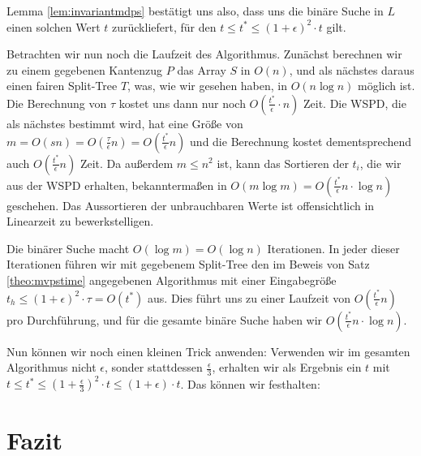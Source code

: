 \documentclass[11pt]{article}
\begin{document}
	Lemma \ref{lem:invariantmdps} bestätigt uns also, dass uns die binäre Suche in $L$ einen solchen Wert $t$ zurückliefert, für den $t \leq t^* \leq (1 + \epsilon)^2 \cdot t$ gilt.
	
	Betrachten wir nun noch die Laufzeit des Algorithmus.
	Zunächst berechnen wir zu einem gegebenen Kantenzug $P$ das Array $S$ in $O(n)$, und als nächstes daraus einen fairen Split-Tree $T$, was, wie wir gesehen haben, in $O(n \log n)$ möglich ist. 
	Die Berechnung von $\tau$ kostet uns dann nur noch $O(\frac{t^*}{\epsilon} \cdot n)$ Zeit. 
	Die WSPD, die als nächstes bestimmt wird, hat eine Größe von $m = O(sn) = O(\frac{\tau}{\epsilon}n) = O(\frac{t^*}{\epsilon}n)$ und die Berechnung kostet dementsprechend auch $O(\frac{t^*}{\epsilon}n)$ Zeit. 
	Da außerdem $m \leq n^2$ ist, kann das Sortieren der $t_i$, die wir aus der WSPD erhalten, bekanntermaßen in $O(m \log m) = O(\frac{t^*}{\epsilon}n \cdot \log n)$ geschehen. 
	Das Aussortieren der unbrauchbaren Werte ist offensichtlich in Linearzeit zu bewerkstelligen. 
	
	Die binärer Suche macht $O(\log m) = O(\log n)$ Iterationen. 
	In jeder dieser Iterationen führen wir mit gegebenem Split-Tree den im Beweis von Satz \ref{theo:mvpstime} angegebenen Algorithmus mit einer Eingabegröße $t_h \leq (1 + \epsilon)^2 \cdot \tau = O(t^*)$ aus. 
	Dies führt uns zu einer Laufzeit von $O(\frac{t^*}{\epsilon}n)$ pro Durchführung, und für die gesamte binäre Suche haben wir $O(\frac{t^*}{\epsilon}n \cdot \log n)$.
	
	Nun können wir noch einen kleinen Trick anwenden: Verwenden wir im gesamten Algorithmus nicht $\epsilon$, sonder stattdessen $\frac{\epsilon}{3}$, erhalten wir als Ergebnis ein $t$ mit $t \leq t^* \leq (1 + \frac{\epsilon}{3})^2 \cdot t \leq (1 + \epsilon)\cdot t$. Das können wir festhalten:
	
	
	
	\section{Fazit}
    \label{sec:fazit}

    
    
\end{document}
